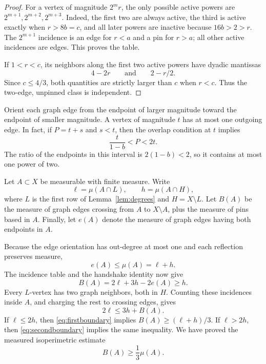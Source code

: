 \documentclass[11pt]{article}
\begin{document}
\begin{proof}
For a vertex of magnitude $2^mr$, the only possible active powers are
$2^{m+1},2^{m+2},2^{m+3}$.  Indeed, the first two are always active, the
third is active exactly when $r>8b=c$, and all later powers are inactive
because $16b>2>r$.  The $2^{m+1}$ incidence is an edge for $r<a$ and a pin
for $r>a$; all other active incidences are edges.  This proves the table.

If $1<r<c$, its neighbors along the first two active powers have dyadic
mantissas
\begin{equation}\label{eq:neighbors}
 4-2r\qquad\text{and}\qquad 2-r/2.
\end{equation}
Since $c\leq4/3$, both quantities are strictly larger than $c$ when $r<c$.
Thus the two-edge, unpinned class is independent.
\end{proof}

Orient each graph edge from the endpoint of larger magnitude toward the
endpoint of smaller magnitude.  A vertex of magnitude $t$ has at most one
outgoing edge.  In fact, if $P=t+s$ and $s<t$, then the overlap condition at
$t$ implies
\begin{equation}\label{eq:oneout}
 \frac{t}{1-b}<P<2t.
\end{equation}
The ratio of the endpoints in this interval is $2(1-b)<2$, so it contains at
most one power of two.

Let $A\subset X$ be measurable with finite measure.  Write
\[
 \ell=\mu(A\cap L),\qquad h=\mu(A\cap H),
\]
where $L$ is the first row of Lemma~\ref{lem:degrees} and $H=X\setminus L$.
Let $B(A)$ be the measure of graph edges crossing from $A$ to $X\setminus A$,
plus the measure of pins based in $A$.  Finally, let $e(A)$ denote the measure
of graph edges having both endpoints in $A$.

Because the edge orientation has out-degree at most one and each reflection
preserves measure,
\begin{equation}\label{eq:internal}
 e(A)\leq\mu(A)=\ell+h.
\end{equation}
The incidence table and the handshake identity now give
\begin{equation}\label{eq:firstboundary}
 B(A)=2\ell+3h-2e(A)\geq h.
\end{equation}
Every $L$-vertex has two graph neighbors, both in $H$.  Counting these
incidences inside $A$, and charging the rest to crossing edges, gives
\begin{equation}\label{eq:secondboundary}
 2\ell\leq3h+B(A).
\end{equation}
If $\ell\leq2h$, then \eqref{eq:firstboundary} implies
$B(A)\geq(\ell+h)/3$.  If $\ell>2h$, then
\eqref{eq:secondboundary} implies the same inequality.  We have proved the
measured isoperimetric estimate
\begin{equation}\label{eq:cheeger}
 B(A)\geq\frac13\mu(A).
\end{equation}
\end{document}
